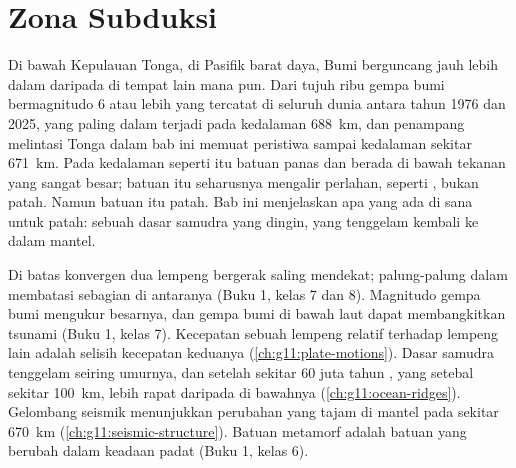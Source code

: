 \chapter{Zona Subduksi}\label{ch:g11:subduction-zones}

Di bawah Kepulauan Tonga, di Pasifik barat daya, Bumi berguncang jauh lebih
dalam daripada di tempat lain mana pun. Dari tujuh ribu gempa bumi bermagnitudo
6 atau lebih yang tercatat di seluruh dunia antara tahun 1976 dan 2025, yang
paling dalam terjadi pada kedalaman \qty{688}{km}, dan penampang melintasi Tonga
dalam bab ini memuat peristiwa sampai kedalaman sekitar \qty{671}{km}. Pada
kedalaman seperti itu batuan panas dan berada di bawah tekanan yang sangat besar;
batuan itu seharusnya mengalir perlahan, seperti , bukan patah. Namun
batuan itu patah. Bab ini menjelaskan apa yang ada di sana untuk patah: sebuah
 dasar samudra yang dingin, yang tenggelam kembali ke dalam mantel.

\begin{recall}
Di batas konvergen dua lempeng bergerak saling mendekat; palung-palung dalam
membatasi sebagian di antaranya (Buku 1, kelas 7 dan 8). Magnitudo gempa bumi
mengukur besarnya, dan gempa bumi di bawah laut dapat membangkitkan tsunami
(Buku 1, kelas 7). Kecepatan sebuah lempeng relatif terhadap lempeng lain adalah
selisih kecepatan keduanya (\cref{ch:g11:plate-motions}). Dasar samudra tenggelam
seiring umurnya, dan setelah sekitar 60 juta tahun , yang setebal
sekitar \qty{100}{km}, lebih rapat daripada  di bawahnya
(\cref{ch:g11:ocean-ridges}). Gelombang seismik menunjukkan perubahan yang tajam
di mantel pada sekitar \qty{670}{km} (\cref{ch:g11:seismic-structure}). Batuan
metamorf adalah batuan yang berubah dalam keadaan padat (Buku 1, kelas 6).
\end{recall}

